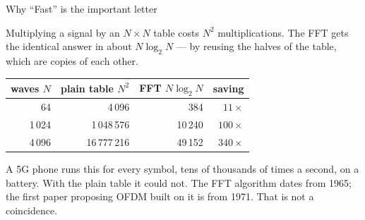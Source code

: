 \begin{frame}{Why ``Fast'' is the important letter}
  \vspace{0.3em}
  {\small Multiplying a signal by an $N\times N$ table costs $N^2$ multiplications.
   The FFT gets the identical answer in about $N\log_2 N$ --- by reusing the halves of
   the table, which are copies of each other.\par}

  \vspace{0.6em}
  \centering
  {\small
  \renewcommand{\arraystretch}{1.3}
  \begin{tabular}{r r r r}
    \toprule
    waves $N$ & plain table $N^2$ & FFT $N\log_2 N$ & saving \\
    \midrule
    64    & 4\,096       & 384    & $11\times$ \\
    1\,024 & 1\,048\,576 & 10\,240 & $100\times$ \\
    4\,096 & 16\,777\,216 & 49\,152 & $340\times$ \\
    \bottomrule
  \end{tabular}}

  \vspace{0.7em}
  {\small A 5G phone runs this for every symbol, tens of thousands of times a second,
   on a battery. With the plain table it could not. The FFT algorithm dates from 1965;
   the first paper proposing OFDM built on it is from 1971. That is not a
   coincidence.\par}

  \vspace{0.3em}
\end{frame}

